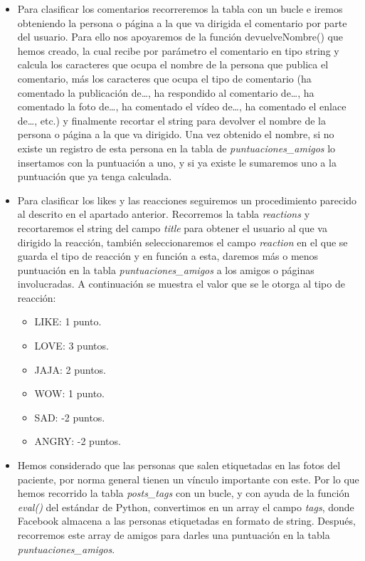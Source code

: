 \begin{itemize}
	\item Para clasificar los comentarios recorreremos la tabla con un bucle e iremos obteniendo la persona o página a la que va dirigida el comentario por parte del usuario. Para ello nos apoyaremos de la función devuelveNombre() que hemos creado, la cual recibe por parámetro el comentario en tipo string y calcula los caracteres que ocupa el nombre de la persona que publica el comentario, más los caracteres que ocupa el tipo de comentario (ha comentado la publicación de…, ha respondido al comentario de…, ha comentado la foto de…, ha comentado el vídeo de…, ha comentado el enlace de…, etc.) y finalmente recortar el string para devolver el nombre de la persona o página a la que va dirigido.
	Una vez obtenido el nombre, si no existe un registro de esta persona en la tabla de \textit{puntuaciones\_amigos} lo insertamos con la puntuación a uno, y si ya existe le sumaremos uno a la puntuación que ya tenga calculada.
	
	\item Para clasificar los likes y las reacciones seguiremos un procedimiento parecido al descrito en el apartado anterior. Recorremos la tabla \textit{reactions} y recortaremos el string del campo \textit{title} para obtener el usuario al que va dirigido la reacción, también seleccionaremos el campo \textit{reaction} en el que se guarda el tipo de reacción y en función a esta, daremos más o menos puntuación en la tabla \textit{puntuaciones\_amigos} a los amigos o páginas involucradas. A continuación se muestra el valor que se le otorga al tipo de reacción:
	\begin{itemize}
		\item LIKE: 1 punto.
		\item LOVE: 3 puntos.
		\item JAJA: 2 puntos.
		\item WOW: 1 punto.
		\item SAD: -2 puntos.
		\item ANGRY: -2 puntos.
	\end{itemize}

	\item Hemos considerado que las personas que salen etiquetadas en las fotos del paciente, por norma general tienen un vínculo importante con este. Por lo que hemos recorrido la tabla \textit{posts\_tags} con un bucle, y con ayuda de la función \textit{eval()} del estándar de Python, convertimos en un array el campo \textit{tags}, donde Facebook almacena a las personas etiquetadas en formato de string. Después, recorremos este array de amigos para darles una puntuación en la tabla \textit{puntuaciones\_amigos}.
	

\end{itemize}
